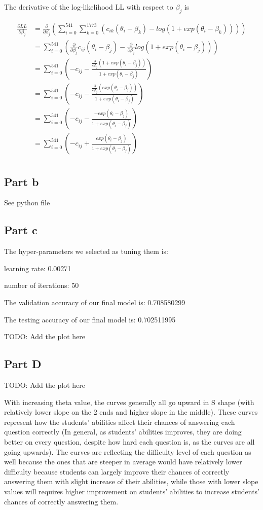 \documentclass[12pt]{article}
\begin{document}
The derivative of the log-likelihood LL with respect to $\beta_{j}$ is

\[
\begin{split}
\frac{\partial LL}{\partial \beta_{j}} &= \frac{\partial}{\partial \beta_{j}} (\sum_{i=0}^{541}\sum_{k=0}^{1773} (c_{ik}(\theta_{i}-\beta_{k})  - log(1+exp(\theta_{i} - \beta_{k}))))\\
&= \sum_{i=0}^{541} (\frac{\partial}{\partial \beta_{j}}c_{ij}(\theta_{i}-\beta_{j}) - \frac{\partial}{\partial \beta_{j}}log(1+exp(\theta_{i} - \beta_{j}))) \\
&= \sum_{i=0}^{541} (-c_{ij} - \frac{\frac{\partial}{\partial \beta_{j}}(1+exp(\theta_{i} - \beta_{j}))}{1+exp(\theta_{i} - \beta_{j})}) \\
&= \sum_{i=0}^{541} (-c_{ij} - \frac{\frac{\partial}{\partial \beta_{j}}(exp(\theta_{i} - \beta_{j}))}{1+exp(\theta_{i} - \beta_{j})}) \\
&= \sum_{i=0}^{541} (-c_{ij} - \frac{-exp(\theta_{i} - \beta_{j})}{1+exp(\theta_{i} - \beta_{j})}) \\
&= \sum_{i=0}^{541} (-c_{ij} + \frac{exp(\theta_{i} - \beta_{j})}{1+exp(\theta_{i} - \beta_{j})}) \\
 \end{split}
\]
\subsection{Part b}
See python file


\subsection{Part c}
The hyper-parameters we selected as tuning them is:

learning rate:  0.00271

number of iterations: 50

The validation accuracy of our final model is: 0.708580299

The testing accuracy of our final model is: 0.702511995

TODO: Add the plot here

\subsection{Part D}
TODO: Add the plot here

With increasing theta value, the curves generally all go upward in S shape (with relatively lower slope on the 2 ends and higher slope in the middle).
These curves represent how the students' abilities affect their chances of answering each question correctly (In general, as students' abilities improves, they are doing better on every question, despite how hard each question is, as the curves are all going upwards). The curves are reflecting the difficulty level of each question as well because the ones that are steeper in average would have relatively lower difficulty because students can largely improve their chances of correctly answering them with slight increase of their abilities, while those with lower slope values will requires higher improvement on students' abilities to increase students' chances of correctly answering them.
\end{document}
